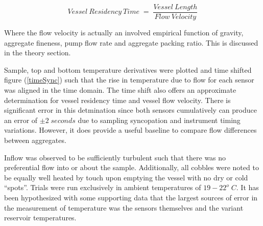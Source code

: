 \[Vessel\:Residency\:Time\;=\;\frac{Vessel\:Length}{Flow\:Velocity}\]

\noindent Where the flow velocity is actually an involved empirical function of gravity, aggregate fineness, pump flow rate and aggregate packing ratio. This is discussed in the theory section. 

Sample, top and bottom temperature derivatives were plotted and time shifted figure (\ref{timeSync}) such that the rise in temperature due to flow for each sensor was aligned in the time domain. The time shift also offers an approximate determination for vessel residency time and vessel flow velocity. There is significant error in this detmination since both sensors cumulatively can produce an error of $\pm2\;seconds$ due to sampling syncopation and instrument timing variations. However, it does provide a useful baseline to compare flow differences between aggregates. 

Inflow was observed to be sufficiently turbulent such that there was no preferential flow into or about the sample. Additionally, all cobbles were noted to be equally well heated by touch upon emptying the vessel with no dry or cold ``spots''. Trials were run exclusively in ambient temperatures of $19-22^{o}\;C$. It has been hypothesized with some supporting data that the largest sources of error in the measurement of temperature was the sensors themselves and the variant reservoir temperatures.